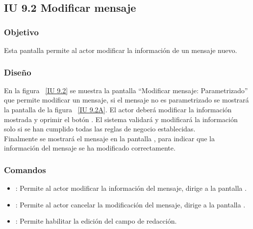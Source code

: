 \newpage 
\subsection{IU 9.2 Modificar mensaje}

\subsubsection{Objetivo}
	
	Esta pantalla permite al actor modificar la información de un mensaje nuevo.

\subsubsection{Diseño}

    En la figura ~\ref{IU 9.2} se muestra la pantalla ``Modificar mensaje: Parametrizado'' que permite modificar un mensaje, si el mensaje no es parametrizado se mostrará la pantalla de la figura ~\ref{IU 9.2A}. El actor deberá modificar la información mostrada y oprimir el botón . El sistema validará y modificará la información solo si se han cumplido todas las reglas de negocio establecidas. \\
    
    Finalmente se mostrará el mensaje  en la pantalla , para indicar que la información del mensaje
    se ha modificado correctamente.        

	

\subsubsection{Comandos}
\begin{itemize}
	\item {}: Permite al actor modificar la información del mensaje, dirige a la pantalla .
	\item {}: Permite al actor cancelar la modificación del mensaje, dirige a la pantalla .
	\item \btnEditar: Permite habilitar la edición del campo de redacción.
	
\end{itemize}

